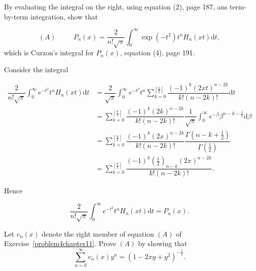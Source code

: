 \begin{problem}\label{problem4chapter11}
By evaluating the integral on the right, using equation (2), page 187, ans term-by-term integration, show that

$$(A) \hspace{30pt} P_n(x) = \dfrac{2}{n! \sqrt{\pi}} \displaystyle\int_0^{\infty} \exp(-t^2) t^n H_n(xt) \mathrm{d}t,$$
which is Curzon's integral for $P_n(x)$, equation (4), page 191.
\end{problem}
\begin{solution}
Consider the integral

$$\begin{array}{ll}
\dfrac{2}{n!\sqrt{\pi}} \displaystyle\int_0^{\infty} e^{-t^2} t^n H_n(xt) \mathrm{d}t &= \dfrac{2}{\sqrt{\pi}} \displaystyle\int_0^{\infty} e^{-t^2} t^n \displaystyle\sum_{k=0}^{[\frac{n}{2}]} \dfrac{(-1)^k (2xt)^{n-2k}}{k! (n-2k)!} \mathrm{d}t \\
&= \displaystyle\sum_{k=0}^{[\frac{n}{2}]} \dfrac{(-1)^k (2k)^{n-2k}}{k! (n-2k)!} \dfrac{1}{\sqrt{\pi}} \displaystyle\int_0^{\infty} e^{-\beta} \beta^{n-k-\frac{1}{2}} \mathrm{d} \beta \\
&= \displaystyle\sum_{k=0}^{[\frac{n}{2}]} \dfrac{(-1)^k (2x)^{n-2k}}{k! (n-2k)!} \dfrac{\Gamma(n-k+\frac{1}{2})}{\Gamma(\frac{1}{2})} \\
&= \displaystyle\sum_{k=0}^{[\frac{n}{2}]} \dfrac{(-1)^k (\frac{1}{2})_{n-k} (2x)^{n-2k}}{k! (n-2k)!}.
\end{array}$$

Hence

$$\dfrac{2}{n! \sqrt{\pi}} \displaystyle\int_0^{\infty} e^{-t^2} t^n H_n(xt) \mathrm{d}t = P_n(x).$$
\end{solution}
\begin{problem}\label{problem5chapter11}
Let $v_n(x)$ denote the right member of equation $(A)$ of Exercise~\ref{problem4chapter11}. Prove $(A)$ by showing that
$$\displaystyle\sum_{n=0}^{\infty} v_n(x) y^n = (1-2xy+y^2)^{-\frac{1}{2}}.$$
\end{problem}
